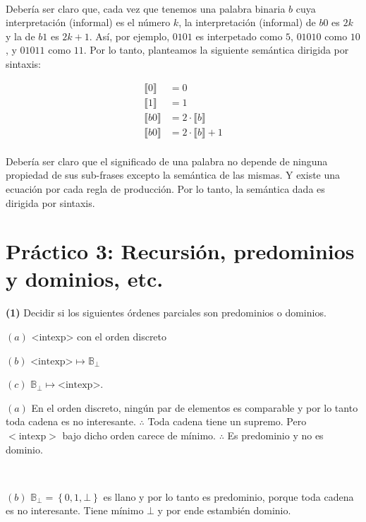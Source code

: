 \documentclass[a4paper, 12pt]{article}
\begin{document}
~

Debería ser claro que, cada vez que tenemos una palabra binaria $b$ cuya
interpretación (informal) es el número $k$, la interpretación (informal) de 
$b0$ es $2k$ y la de $b1$ es $2k+1$. Así, por ejemplo, $0101$ es interpetado
como $5$, $01010$ como $10$, y $01011$ como $11$. Por lo tanto, planteamos la
siguiente semántica dirigida por sintaxis:

\begin{align*}
  \llbracket 0 \rrbracket &= 0 \\ 
  \llbracket 1 \rrbracket &= 1 \\ 
  \llbracket b0 \rrbracket &= 2 \cdot \llbracket b \rrbracket\\
  \llbracket b0 \rrbracket &= 2 \cdot \llbracket b \rrbracket + 1\\
\end{align*}

Debería ser claro que el significado de una palabra no depende de ninguna
propiedad de sus sub-frases excepto la semántica de las mismas. Y existe una
ecuación por cada regla de producción. Por lo tanto, la semántica dada es
dirigida por sintaxis.


\pagebreak
\section{Práctico 3: Recursión, predominios y dominios, etc.}


\begin{myframe}
\textbf{(1)} Decidir si los siguientes órdenes parciales son predominios o
dominios.

$(a)$ <intexp> con el orden discreto

$(b)$ $\text{<intexp>} \mapsto
\mathbb{B}_{\bot}$

$(c)$ $\mathbb{B}_\bot \mapsto \text{<intexp>}$.
\end{myframe}

$(a)$ En el orden discreto, ningún par de elementos es comparable y por lo tanto
toda cadena es no interesante. $\therefore $ Toda cadena tiene un supremo. Pero
$<\text{intexp}>$ bajo dicho orden carece de mínimo. $\therefore $ Es
predominio y no es dominio.

~


$(b)$ $\mathbb{B}_\bot = \left\{ 0,1, \bot  \right\} $ es llano y por lo tanto
es predominio, porque toda cadena es no interesante. Tiene mínimo $\bot$ y por
ende estambién dominio.

~
\end{document}
